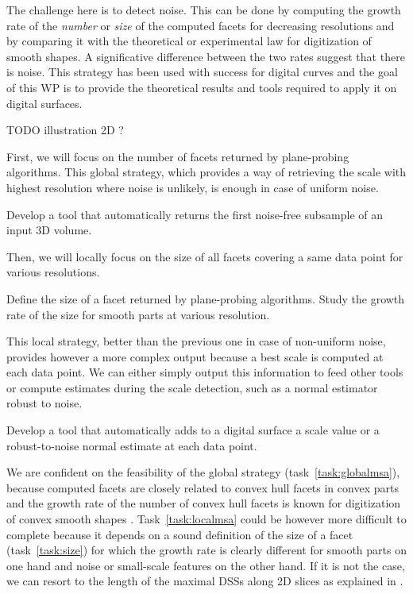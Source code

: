 The challenge here is to detect noise. This can be done by computing the growth rate of the
\emph{number} or \emph{size} of the computed facets for decreasing resolutions
and by comparing it with the theoretical or experimental law for digitization of smooth shapes.
A significative difference between the two rates suggest that there is noise.
This strategy has been used with success for digital curves \cite{Kerautret2012}
and the goal of this WP is to provide the theoretical results and tools required to apply it on digital surfaces. 

TODO illustration 2D ?

First, we will focus on the number of facets returned by plane-probing algorithms.
This global strategy, which provides a way of retrieving the scale with highest resolution
where noise is unlikely, is enough in case of uniform noise. 

\begin{Task}
  \label{task:globalmsa}
  Develop a tool that automatically returns the first noise-free subsample of an input 3D volume.
\end{Task}

Then, we will locally focus on the size of all facets covering a same data point for various resolutions. 

\begin{Task}
  \label{task:size}
  Define the size of a facet returned by plane-probing algorithms. Study the growth rate of the size
  for smooth parts at various resolution. 
\end{Task}

This local strategy, better than the previous one in case of non-uniform noise, provides however
a more complex output because a best scale is computed at each data point.
We can either simply output this information to feed other tools
or compute estimates during the scale detection, such as a normal estimator robust to noise.  

\begin{Task}
  \label{task:localmsa}
  Develop a tool that automatically adds to a digital surface a scale value or
  a robust-to-noise normal estimate at each data point. 
\end{Task}

\Risks
We are confident on the feasibility of the global strategy (task~\ref{task:globalmsa}),
because computed facets are closely related to convex hull facets in convex parts
and the growth rate of the number of convex hull facets is known for digitization
of convex smooth shapes \cite{Barany1998}. 
Task~\ref{task:localmsa} could be however more difficult to complete
because it depends on a sound definition of the size of a facet (task~\ref{task:size})
for which the growth rate is clearly different for smooth parts on one hand
and noise or small-scale features on the other hand. If it is not the case, we can
resort to the length of the maximal DSSs along 2D slices as explained in .

